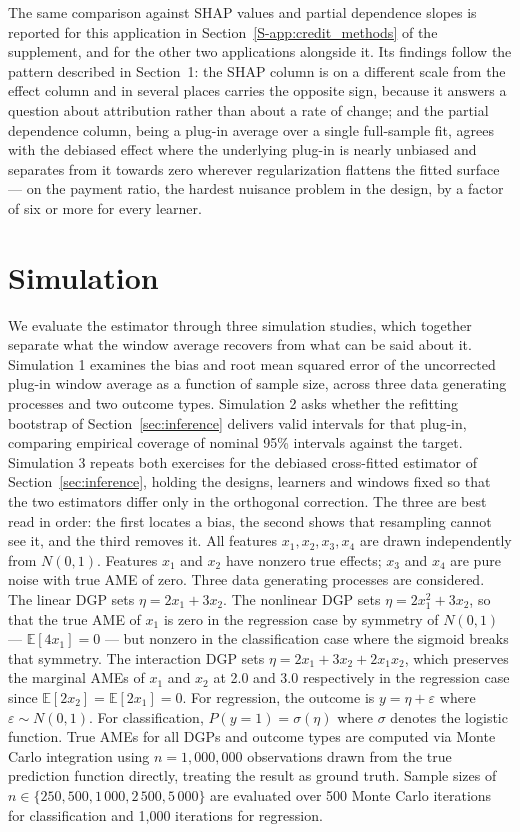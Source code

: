 \documentclass[12pt,a4paper]{article}
\numberwithin{equation}{section}
\theoremstyle{plain}
\theoremstyle{definition}
\begin{document}
		The same comparison against SHAP values and partial dependence slopes is
	reported for this application in Section~\ref{S-app:credit_methods} of the
	supplement, and for the other two applications alongside it. Its findings
	follow the pattern described in Section~1:
	the SHAP column is on a different scale from the effect column and in several
	places carries the opposite sign, because it answers a question about
	attribution rather than about a rate of change; and the partial dependence
	column, being a plug-in average over a single full-sample fit, agrees with
	the debiased effect where the underlying plug-in is nearly unbiased and
	separates from it towards zero wherever regularization flattens the fitted
	surface --- on the payment ratio, the hardest nuisance problem in the design,
	by a factor of six or more for every learner.

	\section{Simulation}
	\label{sec:simulation}
	
	We evaluate the estimator through three simulation studies, which together separate what the window average recovers from what can be said about it. Simulation 1 examines the bias and root mean squared error of the uncorrected plug-in window average as a function of sample size, across three data generating processes and two outcome types. Simulation 2 asks whether the refitting bootstrap of Section~\ref{sec:inference} delivers valid intervals for that plug-in, comparing empirical coverage of nominal 95\% intervals against the target. Simulation 3 repeats both exercises for the debiased cross-fitted estimator of Section~\ref{sec:inference}, holding the designs, learners and windows fixed so that the two estimators differ only in the orthogonal correction. The three are best read in order: the first locates a bias, the second shows that resampling cannot see it, and the third removes it. All features $x_1, x_2, x_3, x_4$ are drawn independently from $N(0,1)$. Features $x_1$ and $x_2$ have nonzero true effects; $x_3$ and $x_4$ are pure noise with true AME of zero. Three data generating processes are considered. The linear DGP sets $\eta = 2x_1 + 3x_2$. The nonlinear DGP sets $\eta = 2x_1^2 + 3x_2$, so that the true AME of $x_1$ is zero in the regression case by symmetry of $N(0,1)$ --- $\mathbb{E}[4x_1] = 0$ --- but nonzero in the classification case where the sigmoid breaks that symmetry. The interaction DGP sets $\eta = 2x_1 + 3x_2 + 2x_1 x_2$, which preserves the marginal AMEs of $x_1$ and $x_2$ at 2.0 and 3.0 respectively in the regression case since $\mathbb{E}[2x_2] = \mathbb{E}[2x_1] = 0$. For regression, the outcome is $y = \eta + \varepsilon$ where $\varepsilon \sim N(0,1)$. For classification, $P(y=1) = \sigma(\eta)$ where $\sigma$ denotes the logistic function. True AMEs for all DGPs and outcome types are computed via Monte Carlo integration using $n = 1{,}000{,}000$ observations drawn from the true prediction function directly, treating the result as ground truth. Sample sizes of $n \in \{250, 500, 1\,000, 2\,500, 5\,000\}$ are evaluated over 500 Monte Carlo iterations for classification and 1{,}000 iterations for regression.
	
\end{document}
